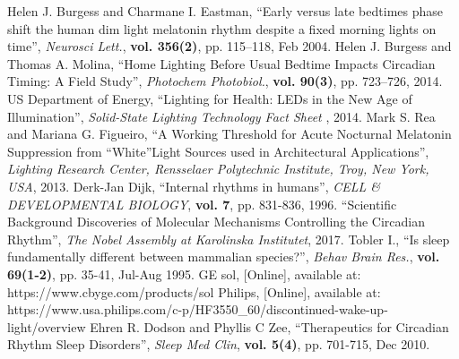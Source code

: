 \begin{thebibliography}{5}
 Helen J. Burgess and Charmane I. Eastman, ``Early versus late bedtimes phase shift the human dim light melatonin rhythm despite a fixed morning lights on time'', \emph{Neurosci Lett.}, {\bf vol. 356(2)}, pp. 115–118, Feb 2004.
 Helen J. Burgess and Thomas A. Molina, ``Home Lighting Before Usual Bedtime Impacts Circadian Timing: A Field Study'', \emph{Photochem Photobiol.}, {\bf vol. 90(3)}, pp. 723–726, 2014.
 US Department of Energy, ``Lighting for Health: LEDs in the New Age of Illumination'', \emph{Solid-State Lighting Technology Fact Sheet }, 2014.
 Mark S. Rea and Mariana G. Figueiro, ``A Working Threshold for Acute Nocturnal Melatonin Suppression from “White”Light Sources used in Architectural Applications'', \emph{Lighting Research Center, Rensselaer Polytechnic Institute, Troy, New York, USA}, 2013.
 Derk-Jan Dijk, ``Internal rhythms in humans'', \emph{CELL \& DEVELOPMENTAL BIOLOGY}, {\bf vol. 7}, pp. 831-836, 1996.
 ``Scientific Background Discoveries of Molecular Mechanisms Controlling the Circadian Rhythm'', \emph{The Nobel Assembly at Karolinska Institutet}, 2017.
 Tobler I., ``Is sleep fundamentally different between mammalian species?'', \emph{Behav Brain Res.}, {\bf vol. 69(1-2)}, pp. 35-41, Jul-Aug 1995.
 GE sol, [Online], available at: https://www.cbyge.com/products/sol
 Philips, [Online], available at: https://www.usa.philips.com/c-p/HF3550\_60/discontinued-wake-up-light/overview
 Ehren R. Dodson and Phyllis C Zee, ``Therapeutics for Circadian Rhythm Sleep Disorders'', \emph{Sleep Med Clin}, \textbf{vol. 5(4)}, pp. 701-715, Dec 2010.


\end{thebibliography}
